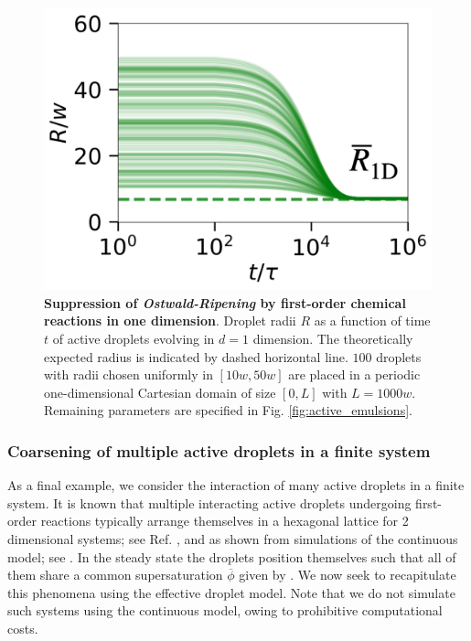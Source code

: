 \begin{figure}[tb]
\centering
\includegraphics[scale=0.24]{MainContent/Figures/active_emulsion_1D.pdf}
\caption{
\textbf{Suppression of \textit{Ostwald-Ripening} by first-order chemical reactions in one dimension}.
Droplet radii $R$ as a function of time $t$ of active droplets evolving in $d=1$ dimension.
The theoretically expected radius is indicated by dashed horizontal line.
$100$ droplets with radii chosen uniformly in $[10w, 50w]$ are placed in a periodic one-dimensional Cartesian domain of size $[0, L]$ with $L=1000 w$.
Remaining parameters are specified in Fig. \ref{fig:active_emulsions}.
}
\label{fig:active_emulsion_1D}
\end{figure}


\subsubsection{Coarsening of multiple active droplets in a finite system}

As a final example, we consider the interaction of many active droplets in a finite system.
It is known that multiple interacting active droplets undergoing first-order reactions typically arrange themselves in a hexagonal lattice for 2 dimensional systems; see Ref. \cite{Zwicker2015}, and as shown from simulations of the continuous model; see .
In the steady state the droplets position themselves such that all of them share a common supersaturation $\overline{\phi}$ given by .
We now seek to recapitulate this phenomena using the effective droplet model.
Note that we do not simulate such systems using the continuous model, owing to prohibitive computational costs.

